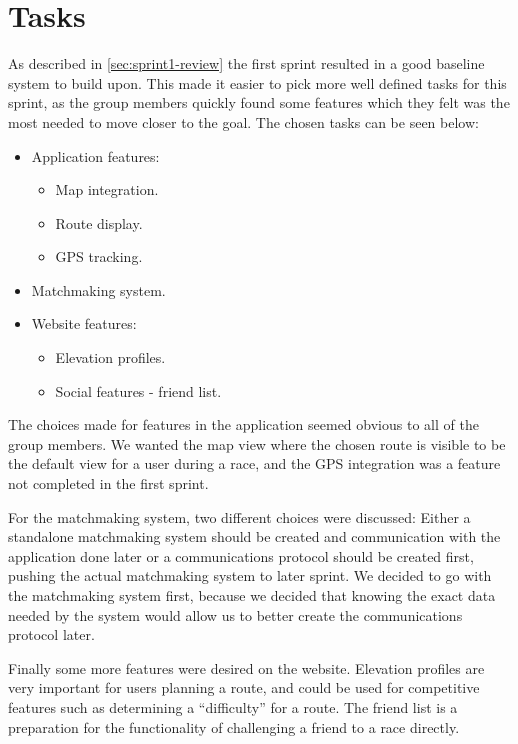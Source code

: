 \section{Tasks}
\label{sec:sprint2-tasks}

As described in \autoref{sec:sprint1-review} the first sprint resulted in a good baseline system to build upon. This made it easier to pick more well defined tasks for this sprint, as the group members quickly found some features which they felt was the most needed to move closer to the goal. The chosen tasks can be seen below:

\begin{itemize}
 \item Application features:
 \begin{itemize}
  \item Map integration.
  \item Route display.
  \item \ac{GPS} tracking.
 \end{itemize}
 \item Matchmaking system.
 \item Website features:
 \begin{itemize}
  \item Elevation profiles.
  \item Social features - friend list.
 \end{itemize}
\end{itemize}

The choices made for features in the application seemed obvious to all of the group members. We wanted the map view where the chosen route is visible to be the default view for a user during a race, and the \ac{GPS} integration was a feature not completed in the first sprint.

For the matchmaking system, two different choices were discussed: Either a standalone matchmaking system should be created and communication with the application done later or a communications protocol should be created first, pushing the actual matchmaking system to later sprint. We decided to go with the matchmaking system first, because we decided that knowing the exact data needed by the system would allow us to better create the communications protocol later.

Finally some more features were desired on the website. Elevation profiles are very important for users planning a route, and could be used for competitive features such as determining a ``difficulty'' for a route. The friend list is a preparation for the functionality of challenging a friend to a race directly.
